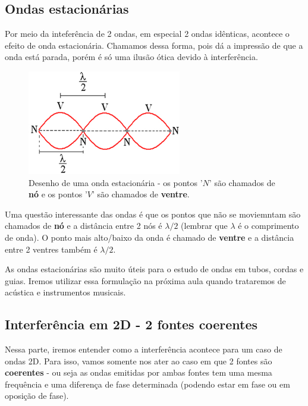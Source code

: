 \documentclass[12pt]{extarticle}
\newcommand{\<}{\langle}
\renewcommand{\>}{\rangle}
\theoremstyle{definition}
\begin{document}
\subsection{Ondas estacionárias}
Por meio da inteferência de 2 ondas, em especial 2 ondas idênticas, acontece o efeito de onda estacionária. Chamamos dessa forma, pois dá a impressão de que a onda está parada, porém é só uma ilusão ótica devido à interferência.
\begin{figure}[H]
    \centering
    \includegraphics[width=0.6\textwidth]{estacionaria.jpg}
    \caption{Desenho de uma onda estacionária - os pontos '$N$' são chamados de \textbf{nó} e os pontos '$V$' são chamados de \textbf{ventre}.}
    \label{fig:estacionaria}
\end{figure}
Uma questão interessante das ondas é que os pontos que não se moviemntam são chamados de \textbf{nó} e a distância entre 2 nós é $\lambda/2$ (lembrar que $\lambda$ é o comprimento de onda). O ponto mais alto/baixo da onda é chamado de \textbf{ventre} e a distância entre 2 ventres também é $\lambda/2$.

As ondas estacionárias são muito úteis para o estudo de ondas em tubos, cordas e guias. Iremos utilizar essa formulação na próxima aula quando trataremos de acústica e instrumentos musicais.

\subsection{Interferência em 2D - 2 fontes coerentes}

Nessa parte, iremos entender como a interferência acontece para um caso de ondas 2D. Para isso, vamos somente nos ater ao caso em que 2 fontes são \textbf{coerentes} - ou seja as ondas emitidas por ambas fontes tem uma mesma frequência e uma diferença de fase determinada (podendo estar em fase ou em oposição de fase).
\end{document}
